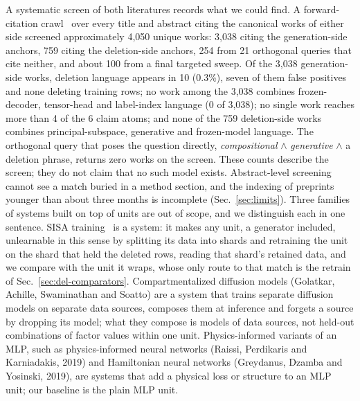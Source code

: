 \documentclass{article} %
\begin{document}
A systematic screen of both literatures records what we could find. A
forward-citation crawl~\citep{priem2022openalex} over every title and abstract citing the canonical works of either side
screened approximately 4,050 unique works: 3,038 citing the generation-side anchors, 759 citing
the deletion-side anchors, 254 from 21 orthogonal queries that cite neither, and about 100 from
a final targeted sweep. %
Of the 3,038 generation-side works, deletion language appears in 10 (0.3\%), seven of them
false positives and none deleting training rows; no work among the 3,038 combines frozen-decoder, tensor-head
and label-index language (0 of 3,038); no single work reaches more than 4 of the 6 claim atoms;
and none of the 759 deletion-side works combines principal-subspace, generative and
frozen-model language. %
The orthogonal query that poses the question directly, \emph{compositional} $\wedge$
\emph{generative} $\wedge$ a deletion phrase, returns zero works on the screen.
These counts describe the screen; they do not claim that no such model exists. Abstract-level
screening cannot see a match buried in a method section, and the indexing of preprints younger
than about three months is incomplete (Sec.~\ref{sec:limits}).
Three families of systems built on top of units are out of scope, and we distinguish each in one sentence.
SISA training~\citep{bourtoule2021machine} is a system: it makes any unit, a generator included,
unlearnable in this sense by splitting its data into shards and retraining the unit on the shard that
held the deleted rows, reading that shard's retained data, and we compare with the unit it wraps,
whose only route to that match is the retrain of Sec.~\ref{sec:del-comparators}.
Compartmentalized diffusion models (Golatkar, Achille, Swaminathan and Soatto\nocite{golatkar2023training}) are a system that
trains separate diffusion models on separate data sources, composes them at inference and forgets a
source by dropping its model; what they compose is models of data sources, not held-out
combinations of factor values within one unit.
Physics-informed variants of an MLP, such as physics-informed neural networks (Raissi, Perdikaris
and Karniadakis, 2019\nocite{raissi2019physics}) and Hamiltonian neural networks (Greydanus, Dzamba and Yosinski, 2019\nocite{greydanus2019hamiltonian}), are
systems that add a physical loss or structure to an MLP unit; our baseline is the plain MLP unit.
\end{document}
